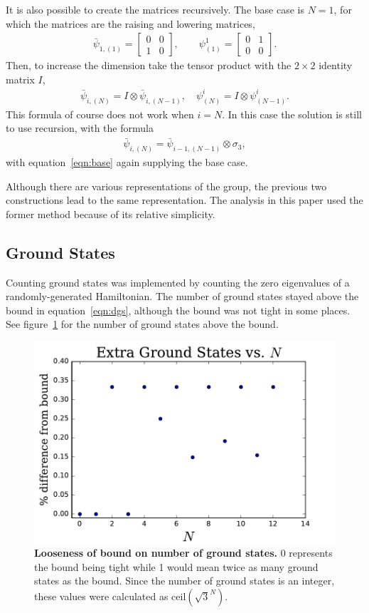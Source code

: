 \documentclass[12pt]{article} %
\begin{document}
It is also possible to create the matrices recursively. The base case is $N=1$, for which the matrices are the raising and lowering matrices,
\begin{align}
\bar\psi_{1,(1)} = \begin{bmatrix} 0&0\\1&0 \end{bmatrix}, \qquad
    \psi^1_{(1)} = \begin{bmatrix} 0&1\\0&0 \end{bmatrix}. \label{eqn:base}
\end{align}
Then, to increase the dimension take the tensor product with the $2\times 2$ identity matrix $I$,
\begin{align}
\bar\psi_{i,(N)} = I\otimes\bar\psi_{i,(N-1)},\quad \psi^i_{(N)} = I\otimes 
	\psi^i_{(N-1)}.
\end{align}
This formula of course does not work when $i=N$. In this case the solution is still to use recursion, with the formula
\begin{align}
\bar\psi_{i,(N)} = \bar\psi_{i-1,(N-1)}\otimes\sigma_3,
\end{align}
with equation~\ref{eqn:base} again supplying the base case.

Although there are various representations of the group, the previous two constructions lead to the same representation. The analysis in this paper used the former method because of its relative simplicity.

\subsection{Ground States} \emph{} \label{sub:num_gs}

Counting ground states was implemented by counting the zero eigenvalues of a randomly-generated Hamiltonian. The number of ground states stayed above the bound in equation~\ref{eqn:dgs}, although the bound was not tight in some places. See figure~\ref{fig:gserr} for the number of ground states above the bound.

\begin{figure}
	\centering
	\includegraphics[width=.5\textwidth]{gserr}
	\caption{\textbf{Looseness of bound on number of ground states.} 0 represents the bound being tight while 1 would mean twice as many ground states as the bound. Since the number of ground states is an integer, these values were calculated as $\text{ceil}(\sqrt{3}^N)$.}
	\label{fig:gserr}
\end{figure}
\end{document}
